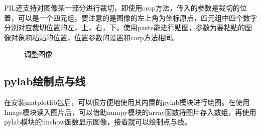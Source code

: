 \documentclass[fontset=ubuntu]{ctexart}
\begin{document}
PIL还支持对图像某一部分进行裁切，即使用crop方法，传入的参数是裁切的位置，可以是一个四元组，要注意的是图像的左上角为坐标原点，四元组中四个数字分别对应裁切位置的左，上，右，下。使用paste能进行贴图，参数为要粘贴的图像对象和粘贴的位置，位置参数的设置和corp方法相同。
\begin{figure}[htb]
    \centering
    \caption{调整图像}
    \label{modify}
\end{figure}

\subsection{pylab绘制点与线}
在安装matplotlib包后，可以很方便地使用其内置的pylab模块进行绘图。在使用Image模块读入图片后，可以借助numpy模块的array函数将图片存入数组，再使用pylab模块的imshow函数显示图像，接着就可以绘制点与线。
\end{document}
